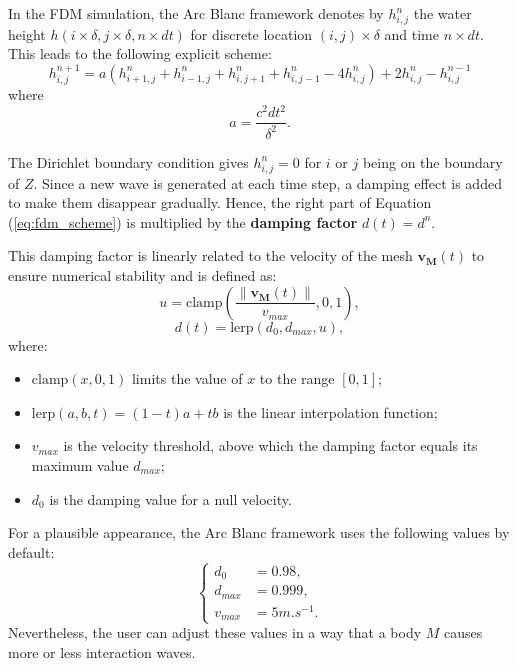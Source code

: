 \documentclass[11pt]{article}
\def\framework{the Arc Blanc framework\xspace}
\begin{document}
In the FDM simulation, \framework denotes by $h_{i,j}^n$ the water height $h(i\times \delta,j\times \delta,n \times dt)$ for discrete location $(i,j)\times \delta$ and time $n\times dt$.
This leads to the following explicit scheme:
\begin{equation}
	\label{eq:fdm_scheme}
	h_{i,j}^{n+1} = a\left(h_{i+1,j}^n+h_{i-1,j}^n+h_{i,j+1}^n+h_{i,j-1}^n-4h_{i,j}^n\right) + 2h_{i,j}^n - h_{i,j}^{n-1}
\end{equation}
where
\begin{equation}
	a=\frac{c^2dt^2}{\delta^2}.
\end{equation}

The Dirichlet boundary condition gives $h_{i,j}^n=0$ for $i$ or $j$ being on the boundary of $Z$. Since a new wave is generated at each time step, a damping effect is added to make them disappear gradually. Hence, the right part of Equation (\ref{eq:fdm_scheme}) is multiplied by the \textbf{damping factor} $d(t) = d^n$.

This damping factor is linearly related to the velocity of the mesh $\mathbf{v_M}(t)$ to ensure numerical stability and is defined as:
\begin{equation*}
	u = \text{clamp}\left(\frac{\|\mathbf{v_M}(t)\|}{v_{max}}, 0, 1\right),
\end{equation*}
\begin{equation}
	d(t) = \text{lerp}(d_0, d_{max}, u),
\end{equation}
where:
\begin{itemize}
	\item $\text{clamp}(x, 0, 1)$ limits the value of $x$ to the range $[0, 1]$;
	\item $\text{lerp}(a, b, t) = (1-t)a + tb$ is the linear interpolation function;
	\item $v_{max}$ is the velocity threshold, above which the damping factor equals its maximum value $d_{max}$;
	\item $d_0$ is the damping value for a null velocity.
\end{itemize}

For a plausible appearance, \framework uses the following values by default:
\begin{equation}
	\begin{cases}
		d_0     & = 0.98,       \\
		d_{max} & = 0.999,      \\
		v_{max} & = 5 m.s^{-1}.
	\end{cases}
\end{equation}
Nevertheless, the user can adjust these values in a way that a body $M$ causes more or less interaction waves.
\end{document}
